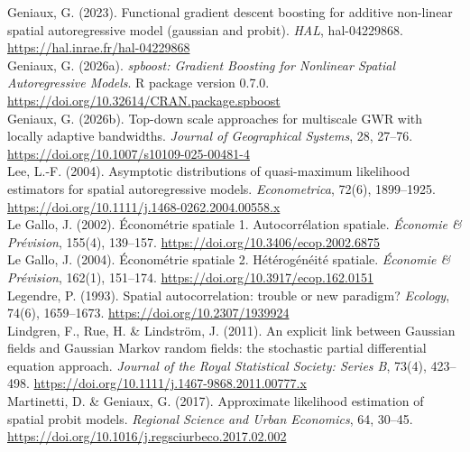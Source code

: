 \documentclass[11pt,a4paper]{article}
\begin{document}
{Geniaux, G. (2023). Functional gradient descent boosting for additive non-linear spatial autoregressive model (gaussian and probit). \textit{HAL}, hal-04229868. \url{https://hal.inrae.fr/hal-04229868}\\[0.2cm]

Geniaux, G. (2026a). \textit{spboost: Gradient Boosting for Nonlinear Spatial Autoregressive Models}. R package version 0.7.0. \url{https://doi.org/10.32614/CRAN.package.spboost}\\[0.2cm]

Geniaux, G. (2026b). Top-down scale approaches for multiscale GWR with locally adaptive bandwidths. \textit{Journal of Geographical Systems}, 28, 27--76. \url{https://doi.org/10.1007/s10109-025-00481-4}\\[0.2cm]

Lee, L.-F. (2004). Asymptotic distributions of quasi-maximum likelihood estimators for spatial autoregressive models. \textit{Econometrica}, 72(6), 1899--1925. \url{https://doi.org/10.1111/j.1468-0262.2004.00558.x}\\[0.2cm]

Le Gallo, J. (2002). Économétrie spatiale 1. Autocorrélation spatiale. \textit{Économie \& Prévision}, 155(4), 139--157. \url{https://doi.org/10.3406/ecop.2002.6875}\\[0.2cm]

Le Gallo, J. (2004). Économétrie spatiale 2. Hétérogénéité spatiale. \textit{Économie \& Prévision}, 162(1), 151--174. \url{https://doi.org/10.3917/ecop.162.0151}\\[0.2cm]

Legendre, P. (1993). Spatial autocorrelation: trouble or new paradigm? \textit{Ecology}, 74(6), 1659--1673. \url{https://doi.org/10.2307/1939924}\\[0.2cm]

Lindgren, F., Rue, H. \& Lindström, J. (2011). An explicit link between Gaussian fields and Gaussian Markov random fields: the stochastic partial differential equation approach. \textit{Journal of the Royal Statistical Society: Series B}, 73(4), 423--498. \url{https://doi.org/10.1111/j.1467-9868.2011.00777.x}\\[0.2cm]

Martinetti, D. \& Geniaux, G. (2017). Approximate likelihood estimation of spatial probit models. \textit{Regional Science and Urban Economics}, 64, 30--45. \url{https://doi.org/10.1016/j.regsciurbeco.2017.02.002}\\[0.2cm]

}
\end{document}
